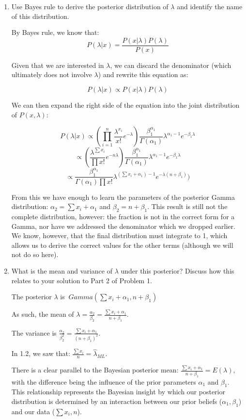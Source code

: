 \documentclass[11pt]{article}
\begin{document}
\begin{enumerate}
\item Use Bayes rule to derive the posterior distribution of $\lambda$ and identify the name of this distribution.

By Bayes rule, we know that:
\[
P(\lambda | x) = \frac{P(x | \lambda) P(\lambda)}{P(x)}
\]

Given that we are interested in $\lambda$, we can discard the denominator (which ultimately does not involve $\lambda$) and rewrite this equation as:

\[
P(\lambda | x) \propto P(x | \lambda) P(\lambda)
\]

We can then expand the right side of the equation into the joint distribution of $P(x, \lambda)$:

\[
P(\lambda | x) \propto  (\prod_{i=1}^{n} \frac{\lambda^{x_i}}{x!} e^{-\lambda}) \frac{\beta_1^{\alpha_1}}{\Gamma(\alpha_1)} \lambda^{\alpha_1 - 1} e^{-\beta_1 \lambda}
\]
\[
\propto  (\frac{\lambda^{\sum x_i}}{\prod x!} e^{-n\lambda}) \frac{\beta_1^{\alpha_1}}{\Gamma(\alpha_1)} \lambda^{\alpha_1 - 1} e^{-\beta_1 \lambda}
\]
\[
\propto  \frac{\beta_1^{\alpha_1}}{\Gamma(\alpha_1) \prod x!} \lambda^{(\sum x_i + \alpha_1) - 1} e^{-\lambda (n + \beta_1)})
\]

From this we have enough to learn the parameters of the posterior Gamma distribution: $\alpha_2 = \sum x_i + \alpha_1$ and $\beta_2 = n + \beta_1$. This result is still not the complete distribution, however: the fraction is not in the correct form for a Gamma, nor have we addressed the denominator which we dropped earlier. We know, however, that the final distribution must integrate to 1, which allows us to derive the correct values for the other terms (although we will not do so here).

\item What is the mean and variance of $\lambda$ under this posterior? Discuss how this relates to your solution to Part 2 of Problem 1.

The posterior $\lambda$ is $~Gamma(\sum x_i + \alpha_1, n + \beta_1)$

As such, the mean of $\lambda = \frac{\alpha_2}{\beta_2} = \frac{\sum x_i + \alpha_1}{n + \beta_1}$.

The variance is $\frac{\alpha_2}{\beta_2^2} = \frac{\sum x_i + \alpha_1}{(n + \beta_1)^2}$.

In 1.2, we saw that: $\frac{\sum x_i}{n} = \hat \lambda_{ML}$.

There is a clear parallel to the Bayesian posterior mean: $\frac{\sum x_i + \alpha_1}{n + \beta_1} = E(\lambda)$, with the difference being the influence of the prior parameters $\alpha_1$ and $\beta_1$. This relationship represents the Bayesian insight by which our posterior distribution is determined by an interaction between our prior beliefs ($\alpha_1, \beta_1$) and our data ($\sum x_i, n$).

\end{enumerate}
\end{document}
